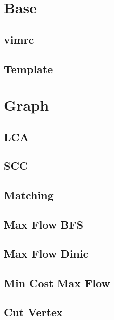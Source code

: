 \documentclass[a4paper,landscape]{article}
\begin{document}
\tableofcontents

\pagebreak

\begin{multicols}{2}

\section{Base}
\subsection{vimrc}
	
\subsection{Template}
	

\section{Graph}
\subsection{LCA}
	
\subsection{SCC}
	
\subsection{Matching}
	
\subsection{Max Flow BFS}
	
\subsection{Max Flow Dinic}
	
\subsection{Min Cost Max Flow}
	
\subsection{Cut Vertex}
	

\end{multicols}
\end{document}
